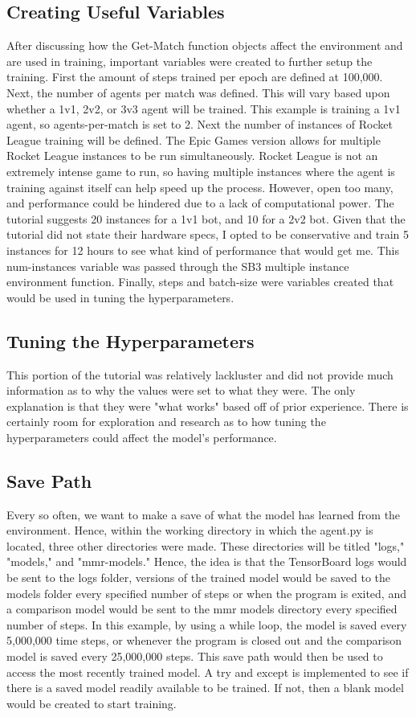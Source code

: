 \documentclass[10pt,twocolumn]{article}
\begin{document}
\subsection{Creating Useful Variables}
After discussing how the Get-Match function objects affect the environment and are used in training, important variables were created to further setup the training. First the amount of steps trained per epoch are defined at 100,000. Next, the number of agents per match was defined. This will vary based upon whether a 1v1, 2v2, or 3v3 agent will be trained. This example is training a 1v1 agent, so agents-per-match is set to 2. Next the number of instances of Rocket League training will be defined. The Epic Games version allows for multiple Rocket League instances to be run simultaneously. Rocket League is not an extremely intense game to run, so having multiple instances where the agent is training against itself can help speed up the process. However, open too many, and performance could be hindered due to a lack of computational power. The tutorial suggests 20 instances for a 1v1 bot, and 10 for a 2v2 bot. Given that the tutorial did not state their hardware specs, I opted to be conservative and train 5 instances for 12 hours to see what kind of performance that would get me. This num-instances variable was passed through the SB3 multiple instance environment function. Finally, steps and batch-size were variables created that would be used in tuning the hyperparameters.


\subsection{Tuning the Hyperparameters}
This portion of the tutorial was relatively lackluster and did not provide much information as to why the values were set to what they were. The only explanation is that they were "what works" based off of prior experience. There is certainly room for exploration and research as to how tuning the hyperparameters could affect the model's performance. 

\subsection{Save Path}

Every so often, we want to make a save of what the model has learned from the environment. Hence, within the working directory in which the agent.py is located, three other directories were made. These directories will be titled "logs," "models," and "mmr-models." Hence, the idea is that the TensorBoard logs would be sent to the logs folder, versions of the trained model would be saved to the models folder every specified number of steps or when the program is exited, and a comparison model would be sent to the mmr models directory every specified number of steps. In this example, by using a while loop, the model is saved every 5,000,000 time steps, or whenever the program is closed out and the comparison model is saved every 25,000,000 steps. This save path would then be used to access the most recently trained model. A try and except is implemented to see if there is a saved model readily available to be trained. If not, then a blank model would be created to start training.
\end{document}
